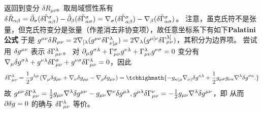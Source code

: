 返回到变分 $\delta R_{\mu\nu}$。取局域惯性系有 $\delta\tilde R_{\alpha\beta} = \tilde{\partial}_\sigma(\delta\tilde\Gamma^\sigma_{\alpha\beta})-\tilde{\partial}_\beta(\delta\tilde \Gamma^\sigma_{\alpha\sigma}) = \nabla_\sigma(\delta\tilde\Gamma^\sigma_{\alpha\beta})-\nabla_\beta(\delta\tilde \Gamma^\sigma_{\alpha\sigma})$。
注意，虽克氏符不是张量，但克氏符变分是张量（作差消去非协变项），故任意坐标系下有如下\textbf{Palatini 公式}
于是 $g^{\mu\nu}\var R_{\mu\nu}=2 \nabla_{[\lambda}( g^{\mu\nu} \delta \Gamma_{\nu]\mu}^\lambda) =2\nabla_\lambda(g^{\mu [\nu} \delta \Gamma_{\mu \nu}^{\lambda]})$，其积分为边界项。
尝试用 $\var g^{\mu\nu}$ 表示 $\var\Gamma_{\mu \nu}^\lambda$。
对 $\partial_\mu g^{\sigma\lambda}+\Gamma^\sigma_{\mu\nu} g^{\nu\lambda}+\Gamma^\lambda_{\mu\nu} g^{\nu\sigma}=0$ 变分有 $\nabla_\mu \delta g^{\sigma\lambda}+g^{\nu\lambda}\delta \Gamma^\sigma_{\mu\nu} +g^{\nu\sigma}\delta \Gamma^\lambda_{\mu\nu} =0$，因此
\[\var\Gamma_{\mu \nu}^\lambda=
\frac12 g^{\lambda\rho}
\left(
\cd_\mu \delta g_{\rho\nu}
+
\cd_\nu \delta g_{\rho\mu}
-
\cd_\rho \delta g_{\mu\nu}
\right)
=\tcbhighmath{
    -g_{\kappa(\mu} \cd_{\nu)}\delta g^{\kappa \lambda}+\frac 12 g_{\mu \sigma} g_{\nu \kappa} \cd^\lambda\delta g^{\sigma\kappa}.
}\]
故 $g^{\mu \nu} \delta \Gamma_{\mu \nu}^{\lambda}=\frac12 g_{\mu\nu}\nabla^\lambda \delta g^{\mu\nu}-g_{\mu\nu}\nabla^\nu\delta g^{\mu\lambda},g^{\mu \lambda} \delta \Gamma_{\mu \nu}^{\nu}=-\frac12 g_{\mu\nu}\nabla^\lambda \delta g^{\mu\nu}$，即
从而 $\partial\delta g=0$ 的确与 $\var\Gamma_{\mu \nu}^\lambda$ 等价。

